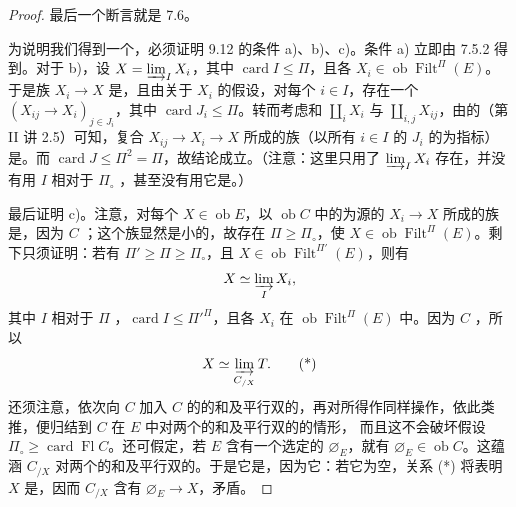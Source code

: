 \begin{proof}
最后一个断言就是 7.6。

为说明我们得到一个，必须证明 9.12 的条件 a)、b)、c)。条件 a) 立即由 7.5.2 得到。对于 b)，设 $X=\varinjlim_I X_i$，其中 $\operatorname{card}I\leq\Pi$，且各 $X_i\in\operatorname{ob}\operatorname{Filt}^\Pi(E)$。于是族 $X_i\to X$ 是，且由关于 $X_i$ 的假设，对每个 $i\in I$，存在一个 $(X_{ij}\to X_i)_{j\in J_i}$，其中 $\operatorname{card}J_i\leq\Pi$。转而考虑和 $\coprod_iX_i$ 与 $\coprod_{i,j}X_{ij}$，由的（第 II 讲 2.5）可知，复合 $X_{ij}\to X_i\to X$ 所成的族（以所有 $i\in I$ 的 $J_i$ 的为指标）是。而 $\operatorname{card}J\leq\Pi^2=\Pi$，故结论成立。（注意：这里只用了 $\varinjlim_I X_i$ 存在，并没有用 $I$ 相对于 $\Pi_\circ$ ，甚至没有用它是。）

最后证明 c)。注意，对每个 $X\in\operatorname{ob}E$，以 $\operatorname{ob}C$ 中的为源的 $X_i\to X$ 所成的族是，因为 $C$ ；这个族显然是小的，故存在 $\Pi\geq\Pi_\circ$，使 $X\in\operatorname{ob}\operatorname{Filt}^\Pi(E)$。剩下只须证明：若有 $\Pi'\geq\Pi\geq\Pi_\circ$，且 $X\in\operatorname{ob}\operatorname{Filt}^{\Pi'}(E)$，则有
\[
X\simeq\varinjlim_I X_i,
\]
其中 $I$ 相对于 $\Pi$ ，$\operatorname{card}I\leq\Pi'^\Pi$，且各 $X_i$ 在 $\operatorname{ob}\operatorname{Filt}^\Pi(E)$ 中。因为 $C$ ，所以
\[
X\simeq\varinjlim_{C_{/X}}T.\tag{*}
\]
还须注意，依次向 $C$ 加入 $C$ 的的和及平行双的，再对所得作同样操作，依此类推，便归结到 $C$ 在 $E$ 中对两个的和及平行双的的情形，
而且这不会破坏假设 $\Pi_\circ\geq\operatorname{card}\operatorname{Fl}C$。还可假定，若 $E$ 含有一个选定的 $\varnothing_E$，就有 $\varnothing_E\in\operatorname{ob}C$。这蕴涵 $C_{/X}$ 对两个的和及平行双的。于是它是，因为它：若它为空，关系 (*) 将表明 $X$ 是，因而 $C_{/X}$ 含有 $\varnothing_E\to X$，矛盾。


\end{proof}
